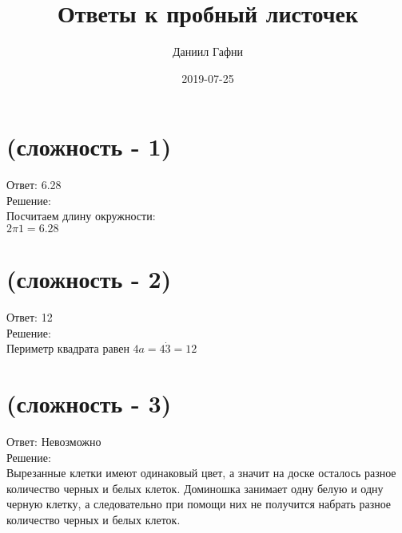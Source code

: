 \documentclass{article}%
\title{Ответы к пробный листочек}%
\author{Даниил Гафни}%
\date{2019{-}07{-}25}%
\begin{document}
%
\normalsize%
\maketitle%
\section{(сложность {-} 1)}%
\label{sec:( {-} 1)}%
\hspace{3ex} Ответ: 6.28 \\%
%
\hspace*{3ex} Решение: \\%
Посчитаем длину окружности: \\ $2 \pi 1 = 6.28$

%
\section{(сложность {-} 2)}%
\label{sec:( {-} 2)}%
\hspace{3ex} Ответ: 12 \\%
%
\hspace*{3ex} Решение: \\%
Периметр квадрата равен $4a = 4 \dot 3 = 12$ 

%
\section{(сложность {-} 3)}%
\label{sec:( {-} 3)}%
\hspace{3ex} Ответ: Невозможно \\%
%
\hspace*{3ex} Решение: \\%
Вырезанные клетки имеют одинаковый цвет, а значит на доске осталось разное количество черных и белых клеток. 
Доминошка занимает одну белую и одну черную клетку, а следовательно при помощи них не получится набрать разное количество черных и белых клеток.

%
\end{document}
